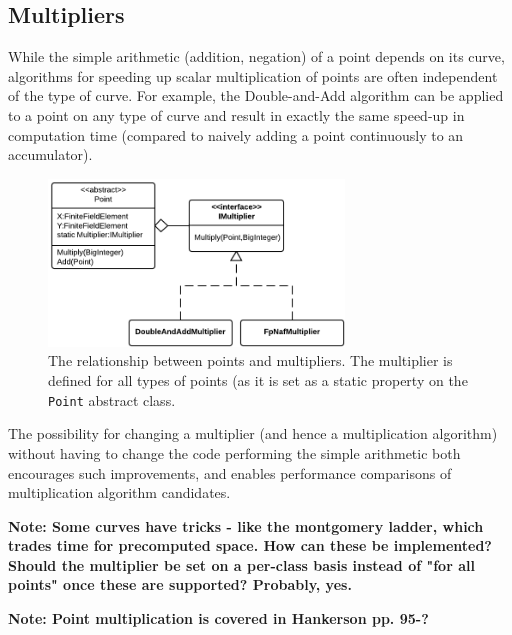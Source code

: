 \subsection{Multipliers}
\label{sec:implementation_multipliers}
\label{sec:implementation_multiplication}

While the simple arithmetic (addition, negation) of a point depends on its curve, algorithms for speeding up scalar
multiplication of points are often independent of the type of curve. For example, the Double-and-Add algorithm can
be applied to a point on any type of curve and result in exactly the same speed-up in computation time (compared to
naively adding a point continuously to an accumulator).

\begin{figure}[htb]
	\centering
	\includegraphics[width=0.7\textwidth]{implementation/multipliers}
	\caption{The relationship between points and multipliers. The multiplier is defined for all types of points (as it
		is set as a static property on the \texttt{Point} abstract class.}
\end{figure}

The possibility for changing a multiplier (and hence a multiplication algorithm) without having to change the code
performing the simple arithmetic both encourages such improvements, and enables performance comparisons of multiplication
algorithm candidates.

\textbf{Note: Some curves have tricks - like the montgomery ladder, which trades time for precomputed space. How can these
be implemented? Should the multiplier be set on a per-class basis instead of "for all points" once these are supported? Probably, yes.}

\textbf{Note: Point multiplication is covered in Hankerson pp. 95-?}
